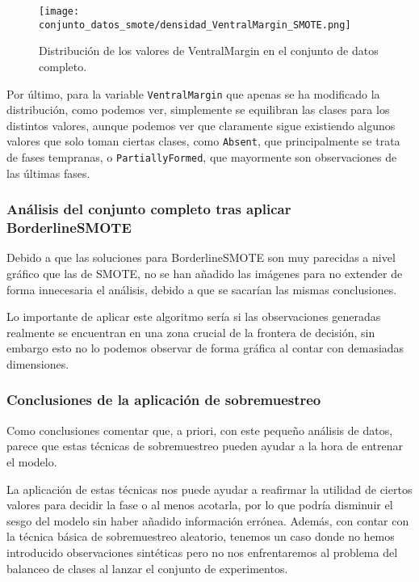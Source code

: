 \begin{figure}[H]
	\centering
	\texttt{[image: conjunto\_datos\_smote/densidad\_VentralMargin\_SMOTE.png]}
	\caption{Distribución de los valores de VentralMargin en el conjunto de datos completo.}
	\label{fig:densidad_VentralMargin_SMOTE}
\end{figure}

Por último, para la variable \texttt{VentralMargin} que apenas se ha modificado la distribución, como podemos ver, simplemente se equilibran las clases para los distintos valores, aunque podemos ver que claramente sigue existiendo algunos valores que solo toman ciertas clases, como \texttt{Absent}, que principalmente se trata de fases tempranas, o \texttt{PartiallyFormed}, que mayormente son observaciones de las últimas fases.

\newpage


\subsubsection{Análisis del conjunto completo tras aplicar BorderlineSMOTE}

Debido a que las soluciones para BorderlineSMOTE son muy parecidas a nivel gráfico que las de SMOTE, no se han añadido las imágenes para no extender de forma innecesaria el análisis, debido a que se sacarían las mismas conclusiones.

Lo importante de aplicar este algoritmo sería si las observaciones generadas realmente se encuentran en una zona crucial de la frontera de decisión, sin embargo esto no lo podemos observar de forma gráfica al contar con demasiadas dimensiones.

\subsubsection{Conclusiones de la aplicación de sobremuestreo}


Como conclusiones comentar que, a priori, con este pequeño análisis de datos, parece que estas técnicas de sobremuestreo pueden ayudar a la hora de entrenar el modelo.

La aplicación de estas técnicas nos puede ayudar a reafirmar la utilidad de ciertos valores para decidir la fase o al menos acotarla, por lo que podría disminuir el sesgo del modelo sin haber añadido información errónea. Además, con contar con la técnica básica de sobremuestreo aleatorio, tenemos un caso donde no hemos introducido observaciones sintéticas pero no nos enfrentaremos al problema del balanceo de clases al lanzar el conjunto de experimentos.



\newpage
